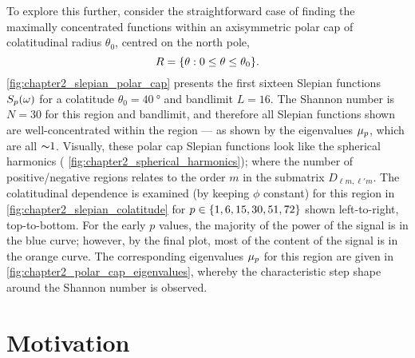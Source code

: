 To explore this further, consider the straightforward case of finding the maximally concentrated functions within an axisymmetric polar cap of colatitudinal radius \(\theta_{0}\), centred on the north pole, \ie{}
%
\begin{equation}
    R
    = \{\theta: 0 \leq \theta \leq \theta_{0}\}.
\end{equation}
%
\cref{fig:chapter2_slepian_polar_cap} presents the first sixteen Slepian functions \({S}_{p}(\omega)\) for a colatitude \(\theta_{0}=\SI{40}{\degree}\) and bandlimit \(L=16\).
The Shannon number is \(N=30\) for this region and bandlimit, and therefore all Slepian functions shown are well-concentrated within the region --- as shown by the eigenvalues \({\mu}_{p}\), which are all \({\thicksim}\num{1}\).
Visually, these polar cap Slepian functions look like the spherical harmonics (\cf{} \cref{fig:chapter2_spherical_harmonics}); where the number of positive/negative regions relates to the order \(m\) in the submatrix \(D_{\ell m,\ell'm}\).
The colatitudinal dependence is examined (by keeping \(\phi{}\) constant) for this region in \cref{fig:chapter2_slepian_colatitude} for \(p \in \{1,6,15,30,51,72\}\) shown left-to-right, top-to-bottom.
For the early \(p\) values, the majority of the power of the signal is in the blue curve; however, by the final plot, most of the content of the signal is in the orange curve.
The corresponding eigenvalues \({\mu}_{p}\) for this region are given in \cref{fig:chapter2_polar_cap_eigenvalues}, whereby the characteristic step shape around the Shannon number is observed.





\section{Motivation}\label{sec:chapter2_motivation}

